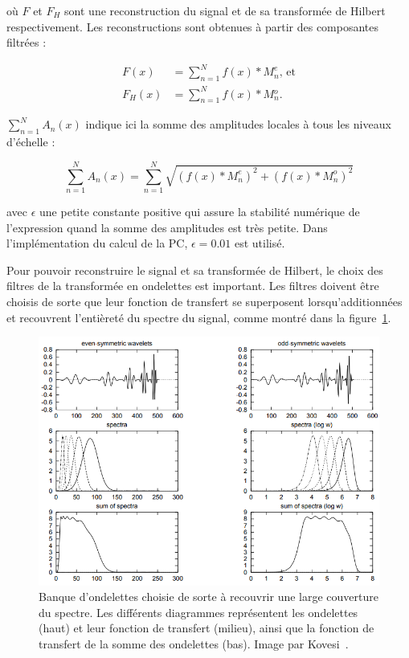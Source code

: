 où $F$ et $F_H$ sont une reconstruction du signal et de sa transformée de Hilbert respectivement. Les reconstructions sont obtenues à partir des composantes filtrées :

\begin{align}
    F(x) &= \sum_{n=1}^{N} f(x)*M_n^e, \,\text{et}\\
    F_H(x) &= \sum_{n=1}^{N} f(x)*M{_n^o}.
\end{align}

$\sum_{n=1}^{N} A_n(x)$ indique ici la somme des amplitudes locales à tous les niveaux d'échelle :

\begin{equation}
    \sum_{n=1}^{N} A_n(x) = \sum_{n=1}^{N} \sqrt{(f(x)*M^e_n)^2 + (f(x)*M^o_n)^2}
\end{equation}

avec $\epsilon$ une petite constante positive qui assure la stabilité numérique de l'expression quand la somme des amplitudes est très petite. Dans l'implémentation du calcul de la PC, $\epsilon = 0.01$ est utilisé.

\bigskip

Pour pouvoir reconstruire le signal et sa transformée de Hilbert, le choix des filtres de la transformée en ondelettes est important. Les filtres doivent être choisis de sorte que leur fonction de transfert se superposent lorsqu'additionnées et recouvrent l'entièreté du spectre du signal, comme montré dans la figure~\ref{fig:wavelet-spectrum-coverage}.

\begin{figure}
           \centering
           \includegraphics[width=.60\textwidth]{contenu/resources/images/wavelet_spectrum_coverage}
           \caption[Choix des ondelettes pour recouvrir le spectre et permettre la reconstruction du signal]{Banque d'ondelettes choisie de sorte à recouvrir une large couverture du spectre. Les différents diagrammes représentent les ondelettes (haut) et leur fonction de transfert (milieu), ainsi que la fonction de transfert de la somme des ondelettes (bas). Image par Kovesi~\cite{kovesi_image_1995}.}
           \label{fig:wavelet-spectrum-coverage}
\end{figure}

